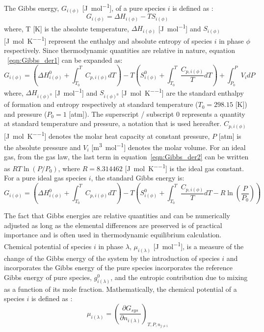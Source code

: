 	The Gibbs energy, $G_{i(\phi)}$ [\si{\joule \per \mole}], of a pure species  $i$ is defined as \cite{Zemansky81}:
	\begin{equation} \label{eqn:Gibbs_der1}
			G_{i(\phi)} = \Delta H_{i(\phi)} - TS_{i(\phi)}
	\end{equation}
	where, T [\si{\kelvin}] is the absolute temperature, $\Delta H_{i(\phi)}$ [\si{\joule \per \mole}] and $S_{i(\phi)}$ [\si{\joule \per \mole \per \kelvin}] represent the enthalpy and absolute entropy of species $i$ in phase $\phi$ respectively. Since thermodynamic quantities are relative in nature, equation ~\eqref{eqn:Gibbs_der1} can be expanded as:
	\begin{equation} \label{eqn:Gibbs_der2}
			G_{i(\phi)} = \left(\Delta H_{i(\phi)}^0 + \int_{T_0}^{T} C_{p,i(\phi)}dT \right) - T\left( S_{i(\phi)}^0  + \int_{T_0}^{T} \frac{C_{p,i(\phi)}}{T}dT \right) + \int_{P_0}^{P} V_i dP
	\end{equation} 
	where, $\Delta H_{i(\phi)^0}$ [\si{\joule \per \mole}] and $S_{i(\phi)^0}$ [\si{\joule \per \mole \per \kelvin}] are the standard enthalpy of formation and entropy respectively at standard temperature ($T_0 = 298.15$ [\si{\kelvin}]) and pressure ($P_0 = 1$ [\si{atm}]). The superscript / subscript $0$ represents a quantity at standard temperature and pressure, a notation that is used hereafter. $C_{p,i(\phi)}$ [\si{\joule \per \mole \per \kelvin}]  denotes the molar heat capacity at constant pressure, $P$ [\si{atm}] is the absolute pressure and $V_i$ [\si{\meter \cubed \per \mole}] denotes the molar volume. For an ideal gas, from the gas law, the last term in equation~\eqref{eqn:Gibbs_der2} can be written as $RT \ln{\left(P/P_0\right)}$, where $R = 8.314462$ [\si{\joule \per \mole \per \kelvin}] is the ideal gas constant. For a pure ideal gas species $i$, the standard Gibbs energy is:
	\begin{equation} \label{eqn:Gibbs_der2}
			G_{i(\phi)} = \left(\Delta H_{i(\phi)}^0 + \int_{T_0}^{T} C_{p,i(\phi)}dT \right) - T\left( S_{i(\phi)}^0  + \int_{T_0}^{T} \frac{C_{p,i(\phi)}}{T}dT  - R \ln{\left(\frac{P}{P_0}\right)}\right) 
	\end{equation} 

	The fact that Gibbs energies are relative quantities and can be numerically adjusted as long as the elemental differences are preserved is of practical importance and is often used in thermodynamic equilibrium calculation. Chemical potential of species $i$ in phase $\lambda$, $\mu_{i(\lambda)}$ [\si{\joule \per \mole}], is a measure of the change of the Gibbs energy of the system by the introduction of species $i$ and incorporates the Gibbs energy of the pure species incorporates the reference Gibbs energy of pure species, $g_{i(\lambda)}^0$, and the entropic contribution due to mixing as a function of its mole fraction. Mathematically, the chemical potential of a species $i$ is defined as \cite{Zemansky81}:
    	\begin{equation}
        		\mu_{i(\lambda)} = {\left (\frac{\partial G_{sys}}{\partial n_{i(\lambda)}} \right )}_{T,P,n_{j \neq i}}
    	\end{equation}
    	
